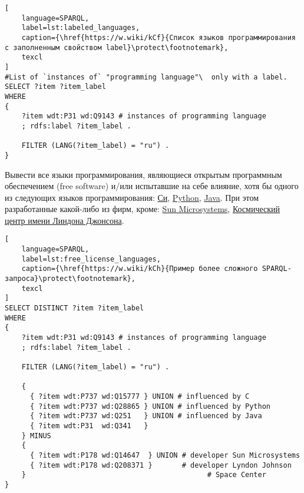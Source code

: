 \begin{lstlisting}[
	language=SPARQL,
	label=lst:labeled_languages,
	caption={\href{https://w.wiki/kCf}{Список языков программирования с заполненным свойством label}\protect\footnotemark},
	texcl
]
#List of `instances of` "programming language"\  only with a label.
SELECT ?item ?item_label
WHERE
{
    ?item wdt:P31 wd:Q9143 # instances of programming language
    ; rdfs:label ?item_label . 

    FILTER (LANG(?item_label) = "ru") . 
}
\end{lstlisting}

Вывести все языки программирования, являющиеся открытым программным обеспечением (free software) и/или испытавшие на себе влияние, хотя бы одного из следующих языков программирования: \href{https://en.wikipedia.org/wiki/C_(programming_language)}{Си}, \href{https://ru.wikipedia.org/wiki/Python}{Python}, \href{https://ru.wikipedia.org/wiki/Java}{Java}. При этом разработанные какой-либо из фирм, кроме: \href{https://ru.wikipedia.org/wiki/Sun_Microsystems}{Sun Microsystems}, \href{https://en.wikipedia.org/wiki/Johnson_Space_Center}{Космический центр имени Линдона Джонсона}.

\pagebreak

\begin{lstlisting}[
	language=SPARQL,
	label=lst:free_license_languages,
	caption={\href{https://w.wiki/kCh}{Пример более сложного SPARQL-запроса}\protect\footnotemark},
	texcl
]
SELECT DISTINCT ?item ?item_label
WHERE
{
    ?item wdt:P31 wd:Q9143 # instances of programming language
    ; rdfs:label ?item_label . 

    FILTER (LANG(?item_label) = "ru") . 

    {
      { ?item wdt:P737 wd:Q15777 } UNION # influenced by C
      { ?item wdt:P737 wd:Q28865 } UNION # influenced by Python
      { ?item wdt:P737 wd:Q251   } UNION # influenced by Java
      { ?item wdt:P31  wd:Q341   }
    } MINUS 
  	{ 
      { ?item wdt:P178 wd:Q14647  } UNION # developer Sun Microsystems
      { ?item wdt:P178 wd:Q208371 }       # developer Lyndon Johnson
    }  										    # Space Center
}
\end{lstlisting}


